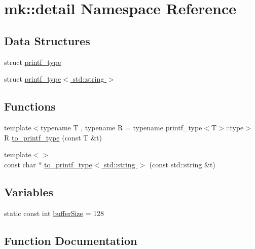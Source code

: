 \hypertarget{namespacemk_1_1detail}{}\section{mk\+:\+:detail Namespace Reference}
\label{namespacemk_1_1detail}
\subsection*{Data Structures}
\begin{DoxyCompactItemize}
\item 
struct \hyperlink{structmk_1_1detail_1_1printf__type}{printf\+\_\+type}
\item 
struct \hyperlink{structmk_1_1detail_1_1printf__type_3_01std_1_1string_01_4}{printf\+\_\+type$<$ std\+::string $>$}
\end{DoxyCompactItemize}
\subsection*{Functions}
\begin{DoxyCompactItemize}
\item 
{\footnotesize template$<$typename T , typename R  = typename printf\+\_\+type$<$\+T$>$\+::type$>$ }\\R \hyperlink{namespacemk_1_1detail_a5679183f4f3f4e989ab6d5091e6922a4}{to\+\_\+printf\+\_\+type} (const T \&t)
\item 
{\footnotesize template$<$$>$ }\\const char $\ast$ \hyperlink{namespacemk_1_1detail_aff3ecd12602e9407db44df98017a506c}{to\+\_\+printf\+\_\+type$<$ std\+::string $>$} (const std\+::string \&t)
\end{DoxyCompactItemize}
\subsection*{Variables}
\begin{DoxyCompactItemize}
\item 
static const int \hyperlink{namespacemk_1_1detail_a1108ca5affa7b4add72c7164eb650949}{buffer\+Size} = 128
\end{DoxyCompactItemize}


\subsection{Function Documentation}
